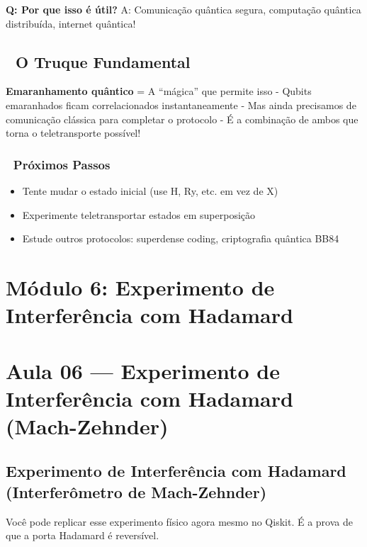 \documentclass[
  brazilian,
]{report}
\providecommand{\tightlist}{%
  \setlength{\itemsep}{0pt}\setlength{\parskip}{0pt}}
\begin{document}
\textbf{Q: Por que isso é útil?} A: Comunicação quântica segura,
computação quântica distribuída, internet quântica!

\section{🎯 O Truque Fundamental}\label{o-truque-fundamental}

\textbf{Emaranhamento quântico} = A ``mágica'' que permite isso - Qubits
emaranhados ficam correlacionados instantaneamente - Mas ainda
precisamos de comunicação clássica para completar o protocolo - É a
combinação de ambos que torna o teletransporte possível!

\subsection{🚀 Próximos Passos}\label{pruxf3ximos-passos-1}

\begin{itemize}
\tightlist
\item
  Tente mudar o estado inicial (use H, Ry, etc. em vez de X)
\item
  Experimente teletransportar estados em superposição
\item
  Estude outros protocolos: superdense coding, criptografia quântica
  BB84
\end{itemize}

\newpage

\chapter{Módulo 6: Experimento de Interferência com
Hadamard}\label{muxf3dulo-6-experimento-de-interferuxeancia-com-hadamard}

\chapter{Aula 06 --- Experimento de Interferência com Hadamard
(Mach-Zehnder)}\label{aula-06-experimento-de-interferuxeancia-com-hadamard-mach-zehnder}

\section{Experimento de Interferência com Hadamard (Interferômetro de
Mach-Zehnder)}\label{experimento-de-interferuxeancia-com-hadamard-interferuxf4metro-de-mach-zehnder}

Você pode replicar esse experimento físico agora mesmo no Qiskit. É a
prova de que a porta Hadamard é reversível.
\end{document}
